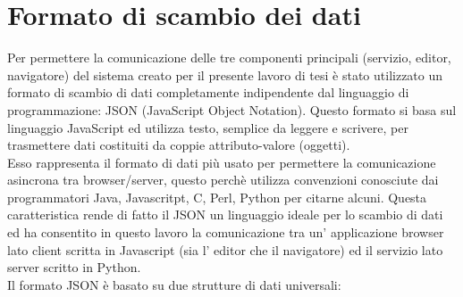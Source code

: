 \section{Formato di scambio dei dati}
\label{sec:chapter_architettura_sistema_formato_scambio}

Per permettere la comunicazione delle  tre componenti principali (servizio, editor, navigatore) del sistema creato per il presente lavoro di tesi è stato utilizzato un formato di scambio di dati completamente indipendente dal linguaggio di programmazione: JSON (JavaScript Object Notation).
Questo formato si basa sul linguaggio JavaScript ed utilizza testo, semplice da leggere e scrivere, per trasmettere dati costituiti da coppie attributo-valore (oggetti).
\\
Esso rappresenta il formato  di dati più usato per permettere la comunicazione asincrona tra browser/server, questo perchè utilizza convenzioni conosciute dai programmatori Java, Javascritpt, C, Perl, Python per citarne alcuni. Questa caratteristica rende di fatto il JSON un linguaggio ideale per lo scambio di dati ed ha consentito in questo lavoro la comunicazione tra un’ applicazione browser lato client scritta in Javascript (sia l’ editor che il navigatore) ed il servizio lato server scritto in Python.
\\
Il formato JSON è basato su due strutture di dati universali:
